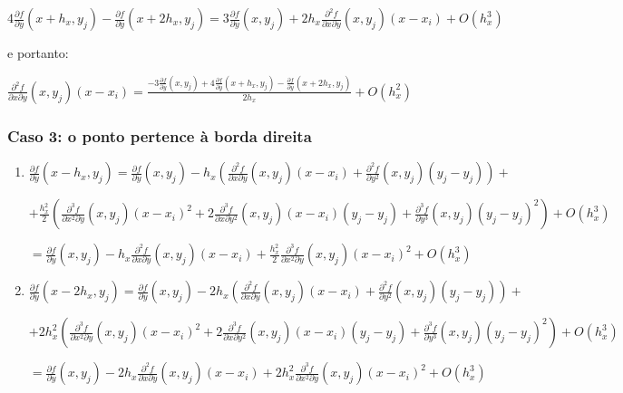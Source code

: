 \documentclass[11pt]{article}
\begin{document}
  $4\frac{\partial f}{\partial y}(x + h_x, y_j) - \frac{\partial f}{\partial y}(x + 2h_x, y_j) = 3\frac{\partial f}{\partial y}(x, y_j) + 2h_x\frac{\partial^2 f}{\partial x \partial y}\left(x, y_j \right)\left(x - x_i \right) + O(h_x^3)$

  e portanto:

  $\frac{\partial^2 f}{\partial x \partial y}\left(x, y_j \right)\left(x - x_i \right) = \frac{-3\frac{\partial f}{\partial y}(x, y_j) + 4\frac{\partial f}{\partial y}(x + h_x, y_j) - \frac{\partial f}{\partial y}(x + 2h_x, y_j)}{2h_x}  + O(h_x^2)$


  \subsubsection{Caso 3: o ponto pertence à borda direita}

  \begin{enumerate}[label=\textbf{\Roman*)}]
    \item $\frac{\partial f}{\partial y}(x - h_x, y_j) = \frac{\partial f}{\partial y}(x, y_j) - h_x\left(\frac{\partial^2 f}{\partial x \partial y}\left(x, y_j \right)\left(x - x_i \right) + \frac{\partial^2 f}{\partial y^2}\left(x, y_j \right)\left(y_j - y_j \right) \right) +$

    $+ \frac{h_x^2}{2}\left(\frac{\partial^3 f}{\partial x^2 \partial y}\left(x, y_j\right)\left(x - x_i\right)^2 + 2\frac{\partial^3 f}{\partial x \partial y^2}\left(x, y_j \right)\left(x - x_i\right)\left(y_j - y_j\right) +
    \frac{\partial^3 f}{\partial y^3}\left(x, y_j\right)\left(y_j - y_j\right)^2 \right) + O(h_x^3)$

    $= \frac{\partial f}{\partial y}(x, y_j) - h_x\frac{\partial^2 f}{\partial x \partial y}\left(x, y_j \right)\left(x - x_i \right) + \frac{h_x^2}{2}\frac{\partial^3 f}{\partial x^2 \partial y}\left(x, y_j\right)\left(x - x_i\right)^2 + O(h_x^3)$

    \item $\frac{\partial f}{\partial y}(x - 2h_x, y_j) = \frac{\partial f}{\partial y}(x, y_j) - 2h_x\left(\frac{\partial^2 f}{\partial x \partial y}\left(x, y_j \right)\left(x - x_i \right) + \frac{\partial^2 f}{\partial y^2}\left(x, y_j \right)\left(y_j - y_j \right) \right) +$

    $+ 2h_x^2\left(\frac{\partial^3 f}{\partial x^2 \partial y}\left(x, y_j\right)\left(x - x_i\right)^2 + 2\frac{\partial^3 f}{\partial x \partial y^2}\left(x, y_j \right)\left(x - x_i\right)\left(y_j - y_j\right) +
    \frac{\partial^3 f}{\partial y^3}\left(x, y_j\right)\left(y_j - y_j\right)^2 \right) + O(h_x^3)$

    $= \frac{\partial f}{\partial y}(x, y_j) - 2h_x\frac{\partial^2 f}{\partial x \partial y}\left(x, y_j \right)\left(x - x_i \right) + 2h_x^2\frac{\partial^3 f}{\partial x^2 \partial y}\left(x, y_j\right)\left(x - x_i\right)^2 + O(h_x^3)$
  \end{enumerate}
\end{document}
